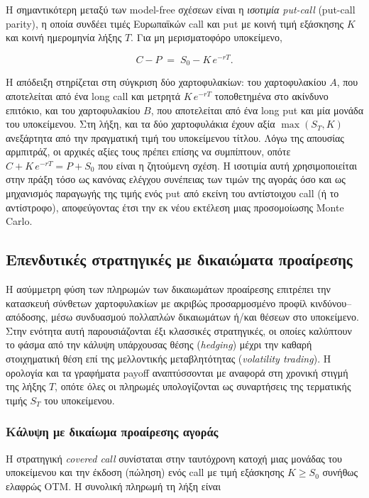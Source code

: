 \documentclass[12pt]{article}
\begin{document}
Η σημαντικότερη μεταξύ των model-free σχέσεων είναι η \emph{ισοτιμία put-call} (put-call parity), η οποία συνδέει τιμές Ευρωπαϊκών call και put με κοινή τιμή εξάσκησης $K$ και κοινή ημερομηνία λήξης $T$. Για μη μερισματοφόρο υποκείμενο,

$$
C - P \;=\; S_0 - K\,e^{-rT} .
$$

Η απόδειξη στηρίζεται στη σύγκριση δύο χαρτοφυλακίων: του χαρτοφυλακίου $A$, που αποτελείται από ένα long call και μετρητά $K\,e^{-rT}$ τοποθετημένα στο ακίνδυνο επιτόκιο, και του χαρτοφυλακίου $B$, που αποτελείται από ένα long put και μία μονάδα του υποκείμενου. Στη λήξη, και τα δύο χαρτοφυλάκια έχουν αξία $\max(S_T, K)$ ανεξάρτητα από την πραγματική τιμή του υποκείμενου τίτλου. Λόγω της απουσίας αρμπιτράζ, οι αρχικές αξίες τους πρέπει επίσης να συμπίπτουν, οπότε $C + K\,e^{-rT} = P + S_0$ που είναι η ζητούμενη σχέση. Η ισοτιμία αυτή χρησιμοποιείται στην πράξη τόσο ως κανόνας ελέγχου συνέπειας των τιμών της αγοράς όσο και ως μηχανισμός παραγωγής της τιμής ενός put από εκείνη του αντίστοιχου call (ή το αντίστροφο), αποφεύγοντας έτσι την εκ νέου εκτέλεση μιας προσομοίωσης Monte Carlo.

\subsection{Επενδυτικές στρατηγικές με δικαιώματα προαίρεσης}

Η ασύμμετρη φύση των πληρωμών των δικαιωμάτων προαίρεσης επιτρέπει την κατασκευή σύνθετων χαρτοφυλακίων με ακριβώς προσαρμοσμένο προφίλ κινδύνου--απόδοσης, μέσω συνδυασμού πολλαπλών δικαιωμάτων ή/και θέσεων στο υποκείμενο. Στην ενότητα αυτή παρουσιάζονται έξι κλασσικές στρατηγικές, οι οποίες καλύπτουν το φάσμα από την κάλυψη υπάρχουσας θέσης (\emph{hedging}) μέχρι την καθαρή στοιχηματική θέση επί της μελλοντικής μεταβλητότητας (\emph{volatility trading}). Η ορολογία και τα γραφήματα payoff αναπτύσσονται με αναφορά στη χρονική στιγμή της λήξης $T$, οπότε όλες οι πληρωμές υπολογίζονται ως συναρτήσεις της τερματικής τιμής $S_T$ του υποκείμενου.

\subsubsection{Κάλυψη με δικαίωμα προαίρεσης αγοράς}

Η στρατηγική \emph{covered call} συνίσταται στην ταυτόχρονη κατοχή μιας μονάδας του υποκείμενου και την έκδοση (πώληση) ενός call με τιμή εξάσκησης $K \geq S_0$ συνήθως ελαφρώς OTM. Η συνολική πληρωμή τη λήξη είναι
\end{document}
